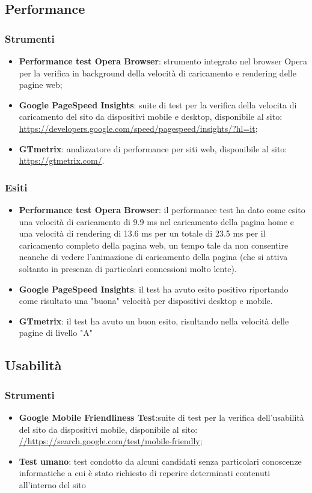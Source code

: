 \documentclass[a4paper,12pt]{article}
\begin{document}
\subsection{Performance}
\subsubsection{Strumenti}
 \begin{itemize}
 	\item \textbf{Performance test Opera Browser}: strumento integrato nel browser Opera per la verifica in background della velocità di caricamento e rendering delle pagine web;
 	\item \textbf{Google PageSpeed Insights}: suite di test per la verifica della velocita di caricamento del sito da dispositivi mobile e desktop, disponibile al sito:\\
 	\url{https://developers.google.com/speed/pagespeed/insights/?hl=it};
 	\item \textbf{GTmetrix}: analizzatore di performance per siti web, disponibile al sito:\\
 	\url{https://gtmetrix.com/}.
 \end{itemize}
\subsubsection{Esiti}
\begin{itemize}
	\item \textbf{Performance test Opera Browser}: il performance test ha dato come esito una velocità di caricamento di 9.9 ms nel caricamento della pagina home e una velocità di rendering di 13.6 ms per un totale di 23.5 ms per il caricamento completo della pagina web, un tempo tale da non consentire neanche di vedere l'animazione di caricamento della pagina (che si attiva soltanto in presenza di particolari connessioni molto lente).
	\item \textbf{Google PageSpeed Insights}: il test ha avuto esito positivo riportando come risultato una "buona" velocità per dispositivi desktop e mobile.
	\item \textbf{GTmetrix}: il test ha avuto un buon esito, risultando nella velocità delle pagine di livello "A"
\end{itemize}
\newpage
\subsection{Usabilità}
\subsubsection{Strumenti}
\begin{itemize}
	\item \textbf{Google Mobile Friendliness Test}:suite di test per la verifica dell’usabilità del	sito da dispositivi mobile, disponibile al sito:\\
	\url{//https://search.google.com/test/mobile-friendly};
	\item \textbf{Test umano}: test condotto da alcuni candidati senza particolari conoscenze informatiche a cui è stato richiesto di reperire determinati contenuti all’interno del sito
\end{itemize}
\end{document}
